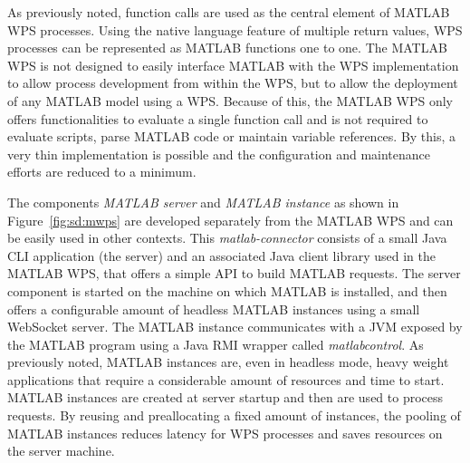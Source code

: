 		As previously noted, function calls are used as the central element of MATLAB WPS processes. Using the native language feature of multiple return values, WPS processes can be represented as MATLAB functions one to one. The MATLAB WPS is not designed to easily interface MATLAB with the WPS implementation to allow process development from within the WPS, but to allow the deployment of any MATLAB model using a WPS. Because of this, the MATLAB WPS only offers functionalities to evaluate a single function call and is not required to evaluate scripts, parse MATLAB code or maintain variable references. By this, a very thin implementation is possible and the configuration and maintenance efforts are reduced to a minimum.

		The components \emph{MATLAB server} and \emph{MATLAB instance} as shown in Figure~\ref{fig:sd:mwps} are developed separately from the MATLAB WPS and can be easily used in other contexts. This \emph{matlab-connector} consists of a small Java CLI application (the server) and an associated Java client library used in the MATLAB WPS, that offers a simple \ac{API} to build MATLAB requests. The server component is started on the machine on which MATLAB is installed, and then offers a configurable amount of headless  MATLAB instances using a small WebSocket server. The MATLAB instance communicates with a \ac{JVM} exposed by the MATLAB program using a Java \ac{RMI} wrapper called \emph{matlabcontrol}. As previously noted, MATLAB instances are, even in headless mode, heavy weight applications that require a considerable amount of resources and time to start. MATLAB instances are created at server startup and then are used to process requests. By reusing and preallocating a fixed amount of instances, the pooling of MATLAB instances reduces latency for WPS processes and saves resources on the server machine.

